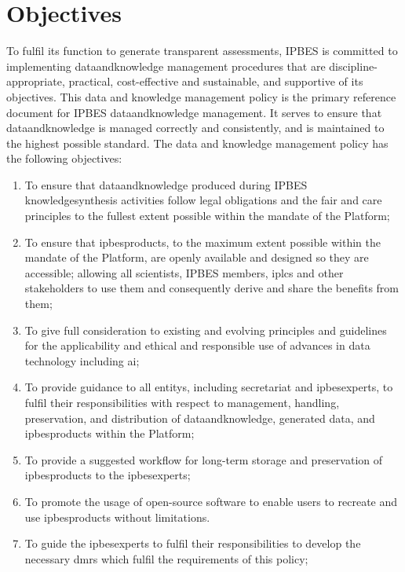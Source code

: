 \documentclass{article}
\begin{document}
\section{Objectives}

To fulfil its function to generate transparent assessments, IPBES is committed to implementing \gls{dataandknowledge} management procedures that are discipline-appropriate, practical, cost-effective and sustainable, and supportive of its objectives. This data and knowledge management policy is the primary reference document for IPBES \gls{dataandknowledge} management. It serves to ensure that \gls{dataandknowledge} is managed correctly and consistently, and is maintained to the highest possible standard. The data and knowledge management policy has the following objectives:


\begin{enumerate}[label=(\alph*)]
    \item To ensure that \gls{dataandknowledge} produced during IPBES \gls{knowledgesynthesis} activities follow legal obligations and the \gls{fair} and \gls{care} principles to the fullest extent possible within the mandate of the Platform;
    
    \item To ensure that \glspl{ipbesproduct}, to the maximum extent possible within the mandate of the Platform, are openly available and designed so they are accessible; allowing all scientists, IPBES members, \glspl{iplc} and other \glspl{stakeholder} to use them and consequently derive and share the benefits from them;

    \item To give full consideration to existing and evolving principles and guidelines for the applicability and ethical and responsible use of advances in data technology including \gls{ai};

    \item To provide guidance to all \glspl{entity}, including \gls{secretariat} and \glspl{ipbesexpert}, to fulfil their responsibilities with respect to management, handling, preservation, and distribution of \gls{dataandknowledge}, generated \gls{data}, and \glspl{ipbesproduct} within the Platform;
    
    \item To provide a suggested \gls{workflow} for long-term storage and preservation of \glspl{ipbesproduct} to the \glspl{ipbesexpert};
    
    \item To promote the usage of open-source software to enable users to recreate and use \glspl{ipbesproduct} without limitations.

    \item To guide the \glspl{ipbesexpert} to fulfil their responsibilities to develop the necessary \glspl{dmr} which fulfil the requirements of this policy;
\end{enumerate}
\end{document}
